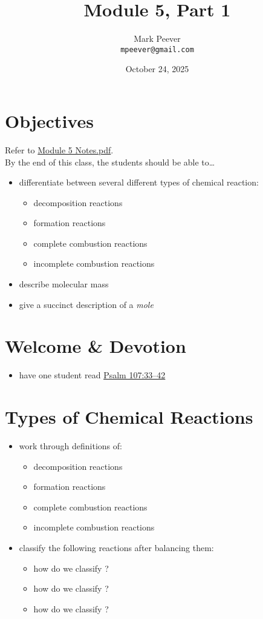 \documentclass[10pt, oneside]{article}   	%
\title{Module 5, Part 1}
\author{Mark Peever\\ \texttt{mpeever@gmail.com}}
\date{October 24, 2025}
\begin{document}
\maketitle

\section*{Objectives}
Refer to \href{https://drive.google.com/file/d/1CKOE3BX37Ix59TutlOzFNpghvfOVk0r7/view?usp=drive_link}{Module 5 Notes.pdf}.\\

By the end of this class, the students should be able to\ldots
\begin{itemize}
\item differentiate between several different types of chemical reaction:
\begin{itemize}
\item  decomposition reactions
\item  formation reactions
\item  complete combustion reactions
\item  incomplete combustion reactions
\end{itemize}
\item describe molecular mass
\item give a succinct description of a \emph{mole}
\end{itemize}

\section*{Welcome \& Devotion}
\begin{itemize}
\item have one student read \href{https://www.biblegateway.com/passage/?search=psalm\%20107\&version=LSB}{Psalm 107:33--42}
\end{itemize}

\section*{Types of Chemical Reactions}
\begin{itemize}
\item work through definitions of:
\begin{itemize}
\item  decomposition reactions
\item  formation reactions
\item  complete combustion reactions
\item  incomplete combustion reactions
\end{itemize}
\item classify the following reactions after balancing them:
\begin{itemize}
\item how do we classify ?
\item how do we classify ?
\item how do we classify ?
\end{itemize}
\end{itemize}
\end{document}
